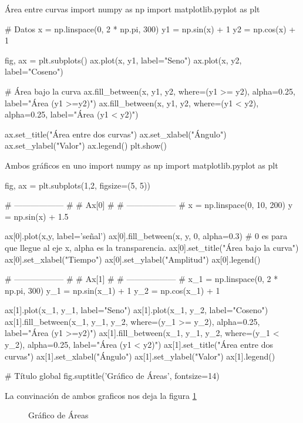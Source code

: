 \begin{pycode}{Área entre curvas}
import numpy as np
import matplotlib.pyplot as plt

# Datos
x = np.linspace(0, 2 * np.pi, 300)
y1 = np.sin(x) + 1
y2 = np.cos(x) + 1

fig, ax = plt.subplots()
ax.plot(x, y1, label="Seno")
ax.plot(x, y2, label="Coseno")

# Área bajo la curva
ax.fill_between(x, y1, y2, where=(y1 >= y2), alpha=0.25, label="Área (y1 >=y2)")
ax.fill_between(x, y1, y2, where=(y1 < y2), alpha=0.25, label="Área (y1 < y2)")

ax.set_title("Área entre dos curvas")
ax.set_xlabel("Ángulo")
ax.set_ylabel("Valor")
ax.legend()
plt.show()    
\end{pycode}

\begin{pycode}{Ambos gráficos en uno}
import numpy as np
import matplotlib.pyplot as plt

fig, ax = plt.subplots(1,2, figsize=(5, 5))

# ------------------ #
#       Ax[0]        #
# ------------------ #
x = np.linspace(0, 10, 200)
y = np.sin(x) + 1.5

ax[0].plot(x,y, label='señal')
ax[0].fill_between(x, y, 0, alpha=0.3) # 0 es para que llegue al eje x, alpha es la transparencia.
ax[0].set_title("Área bajo la curva")
ax[0].set_xlabel("Tiempo")
ax[0].set_ylabel("Amplitud")
ax[0].legend()

# ------------------ #
#       Ax[1]        #
# ------------------ #
x_1 = np.linspace(0, 2 * np.pi, 300)
y_1 = np.sin(x_1) + 1
y_2 = np.cos(x_1) + 1

ax[1].plot(x_1, y_1, label="Seno")
ax[1].plot(x_1, y_2, label="Coseno")
ax[1].fill_between(x_1, y_1, y_2, where=(y_1 >= y_2), alpha=0.25, label="Área (y1 >=y2)")
ax[1].fill_between(x_1, y_1, y_2, where=(y_1 < y_2), alpha=0.25, label="Área (y1 < y2)")
ax[1].set_title("Área entre dos curvas")
ax[1].set_xlabel("Ángulo")
ax[1].set_ylabel("Valor")
ax[1].legend()

# Título global
fig.suptitle('Gráfico de Áreas', fontsize=14)  
\end{pycode}

La convinación de ambos graficos nos deja la figura \ref{fig:grafico_area_curva}

\begin{figure}[ht]
    \centering
     
    \caption{Gráfico de Áreas}
    \label{fig:grafico_area_curva}
\end{figure}


